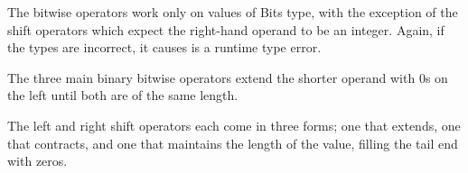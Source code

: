 \begin{prooftree}
\end{prooftree}

\begin{prooftree}
\end{prooftree}

\begin{prooftree}
\end{prooftree}

\FloatBarrier

The bitwise operators work only on values of Bits type, with the exception
of the shift operators which expect the right-hand operand to be an integer.
Again, if the types are incorrect, it causes is a runtime type error.

The three main binary bitwise operators extend the shorter operand with 0s on
the left until both are of the same length.

The left and right shift operators each come in three forms; one that extends,
one that contracts, and one that maintains the length of the value, filling the
tail end with zeros.

\begin{prooftree}
\end{prooftree}

\begin{prooftree}
\end{prooftree}

\begin{prooftree}
\end{prooftree}

